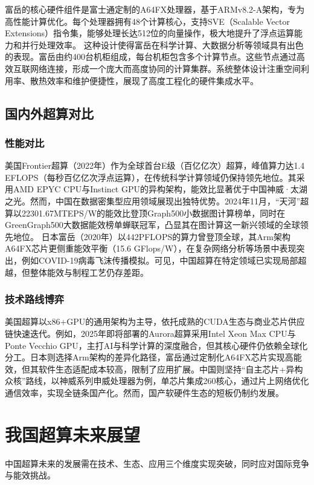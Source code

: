 \documentclass[a4paper]{article}
\begin{document}
富岳的核心硬件组件是富士通定制的A64FX处理器，基于ARMv8.2-A架构，专为高性能计算优化。每个处理器拥有48个计算核心，支持SVE（Scalable Vector Extensions）指令集，能够处理长达512位的向量操作，极大地提升了浮点运算能力和并行处理效率。\cite{8}
这种设计使得富岳在科学计算、大数据分析等领域具有出色的表现。富岳由约400台机柜组成，每台机柜包含多个计算节点。这些节点通过高效互联网络连接，形成一个庞大而高度协同的计算集群。系统整体设计注重空间利用率、散热效率和维护便捷性，展现了高度工程化的硬件集成水平。

\subsection{国内外超算对比}
\subsubsection{性能对比}
美国Frontier超算（2022年）作为全球首台E级（百亿亿次）超算，峰值算力达1.4 EFLOPS（每秒百亿亿次浮点运算），在传统科学计算领域仍保持领先地位。其采用AMD EPYC CPU与Instinct GPU的异构架构，能效比显著优于中国神威·太湖之光。然而，中国在数据密集型应用领域展现出独特优势。2024年11月，“天河”超算以22301.67MTEPS/W的能效比登顶Graph500小数据图计算榜单，同时在GreenGraph500大数据能效榜单蝉联冠军，凸显其在图计算这一新兴领域的全球领先地位。\cite{9}
日本富岳（2020年）以442PFLOPS的算力曾登顶全球，其Arm架构A64FX芯片更侧重能效平衡（15.6 GFlops/W），在复杂网络分析等场景中表现突出，例如COVID-19病毒飞沫传播模拟。可见，中国超算在特定领域已实现局部超越，但整体能效与制程工艺仍存差距。

\subsubsection{技术路线博弈}
美国超算以x86+GPU的通用架构为主导，依托成熟的CUDA生态与商业芯片供应链快速迭代。例如，2025年即将部署的Aurora超算采用Intel Xeon Max CPU与Ponte Vecchio GPU，主打AI与科学计算的深度融合，但其核心硬件仍依赖全球化分工。日本则选择Arm架构的差异化路径，富岳通过定制化A64FX芯片实现高能效，但其软件生态适配成本较高，限制了应用扩展。中国则坚持“自主芯片+异构众核”路线，以神威系列申威处理器为例，单芯片集成260核心，通过片上网络优化通信效率，实现全链条国产化。然而，国产软硬件生态的短板仍制约发展。

\section{我国超算未来展望}
中国超算未来的发展需在技术、生态、应用三个维度实现突破，同时应对国际竞争与能效挑战。
\end{document}
